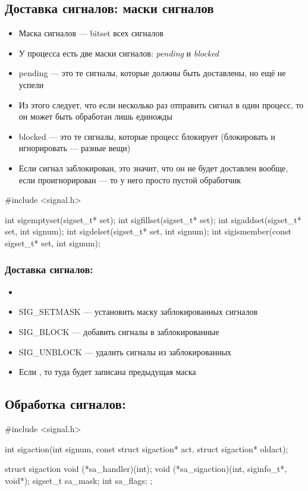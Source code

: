   \subsection{Доставка сигналов: маски сигналов}
    \begin{itemize}
      \item Маска сигналов — bitset всех сигналов
      \item У процесса есть две маски сигналов: \textit{pending} и \textit{blocked}
      \item pending — это те сигналы, которые должны быть доставлены, но ещё не успели
      \item Из этого следует, что если несколько раз отправить сигнал в один процесс, то он может быть обработан лишь единожды
      \item blocked — это те сигналы, которые процесс блокирует (блокировать и игнорировать — разные вещи)
      \item Если сигнал заблокирован, это значит, что он не будет доставлен вообще, если проигнорирован — то у него просто пустой обработчик
    \end{itemize}
    
    \begin{cminted}
#include <signal.h>

int sigemptyset(sigset_t* set);
int sigfillset(sigset_t* set);
int sigaddset(sigset_t* set, int signum);
int sigdelset(sigset_t* set, int signum);
int sigismember(const sigset_t* set, int signum);
    \end{cminted}

  \subsubsection{Доставка сигналов: }
    \begin{itemize}
      \item {}
      \item SIG\_SETMASK — установить маску заблокированных сигналов
      \item SIG\_BLOCK — добавить сигналы  в заблокированные
      \item SIG\_UNBLOCK — удалить сигналы  из заблокированных
      \item Если , то туда будет записана предыдущая маска
    \end{itemize}
  
  \subsection{Обработка сигналов: }
    \begin{cminted}
#include <signal.h>

int sigaction(int signum, const struct sigaction* act,
              struct sigaction* oldact);

struct sigaction {
  void     (*sa_handler)(int);
  void     (*sa_sigaction)(int, siginfo_t*, void*);
  sigset_t   sa_mask;
  int        sa_flags;
};  
    \end{cminted}

